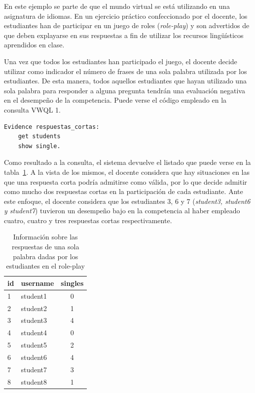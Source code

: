 
			En este ejemplo se parte de que el mundo virtual se está utilizando en una asignatura de idiomas. En un ejercicio práctico confeccionado por el docente, los estudiantes han de participar en un juego de roles (\emph{role-play}) y son advertidos de que deben explayarse en sus respuestas a fin de utilizar los recursos lingüísticos aprendidos en clase.

			Una vez que todos los estudiantes han participado el juego, el docente decide utilizar como indicador el número de frases de una sola palabra utilizada por los estudiantes. De esta manera, todos aquellos estudiantes que hayan utilizado una sola palabra para responder a alguna pregunta tendrán una evaluación negativa en el desempeño de la competencia. Puede verse el código empleado en la consulta VWQL 1.

\begin{verbatim}
Evidence respuestas_cortas:
    get students
    show single.
\end{verbatim}

			Como resultado a la consulta, el sistema devuelve el listado que puede verse en la tabla~\ref{tab:EvsListEj1}. A la vista de los mismos, el docente considera que hay situaciones en las que una respuesta corta podría admitirse como válida, por lo que decide admitir como mucho dos respuestas cortas en la participación de cada estudiante. Ante este enfoque, el docente considera que los estudiantes 3, 6 y 7 (\emph{student3, student6 y student7}) tuvieron un desempeño bajo en la competencia al haber empleado cuatro, cuatro y tres respuestas cortas respectivamente.

\begin{table}
	\centering
	\caption{Información sobre las respuestas de una sola palabra dadas por los estudiantes en el role-play}
	\label{tab:EvsListEj1}
	\begin{tabular}{|l|l|c|}
		\hline
		id & username & singles \\
		\hline
		\hline
		1 & student1 & 0  \\
		\hline
		2 & student2 & 1  \\
		\hline
		3 & student3 & 4  \\
		\hline
		4 & student4 & 0  \\
		\hline
		5 & student5 & 2  \\
		\hline
		6 & student6 & 4  \\
		\hline
		7 & student7 & 3  \\
		\hline
		8 & student8 & 1  \\
		\hline
	\end{tabular}
\end{table}


